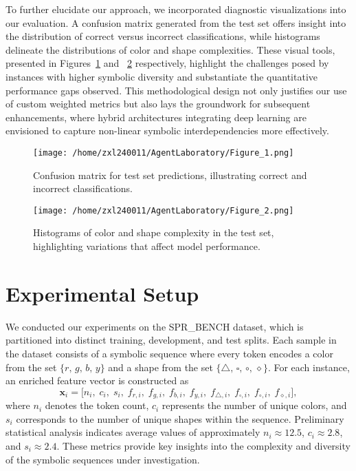 \documentclass{article}
\begin{document}
To further elucidate our approach, we incorporated diagnostic visualizations into our evaluation. A confusion matrix generated from the test set offers insight into the distribution of correct versus incorrect classifications, while histograms delineate the distributions of color and shape complexities. These visual tools, presented in Figures~\ref{fig:fig1} and ~\ref{fig:fig2} respectively, highlight the challenges posed by instances with higher symbolic diversity and substantiate the quantitative performance gaps observed. This methodological design not only justifies our use of custom weighted metrics but also lays the groundwork for subsequent enhancements, where hybrid architectures integrating deep learning are envisioned to capture non-linear symbolic interdependencies more effectively.
 
\begin{figure}[h]
\caption{Confusion matrix for test set predictions, illustrating correct and incorrect classifications.}
\centering
\texttt{[image: /home/zxl240011/AgentLaboratory/Figure\_1.png]}
\label{fig:fig1}
\end{figure}

\begin{figure}[h]
\caption{Histograms of color and shape complexity in the test set, highlighting variations that affect model performance.}
\centering
\texttt{[image: /home/zxl240011/AgentLaboratory/Figure\_2.png]}
\label{fig:fig2}
\end{figure}

\section{Experimental Setup}
We conducted our experiments on the SPR\_BENCH dataset, which is partitioned into distinct training, development, and test splits. Each sample in the dataset consists of a symbolic sequence where every token encodes a color from the set \(\{r,\, g,\, b,\, y\}\) and a shape from the set \(\{\triangle,\, \square,\, \circ,\, \diamond\}\). For each instance, an enriched feature vector is constructed as 
\[
\mathbf{x}_i = \big[n_i,\; c_i,\; s_i,\; f_{r,i},\; f_{g,i},\; f_{b,i},\; f_{y,i},\; f_{\triangle,i},\; f_{\square,i},\; f_{\circ,i},\; f_{\diamond,i}\big],
\]
where \(n_i\) denotes the token count, \(c_i\) represents the number of unique colors, and \(s_i\) corresponds to the number of unique shapes within the sequence. Preliminary statistical analysis indicates average values of approximately \(n_i \approx 12.5\), \(c_i \approx 2.8\), and \(s_i \approx 2.4\). These metrics provide key insights into the complexity and diversity of the symbolic sequences under investigation.
\end{document}
